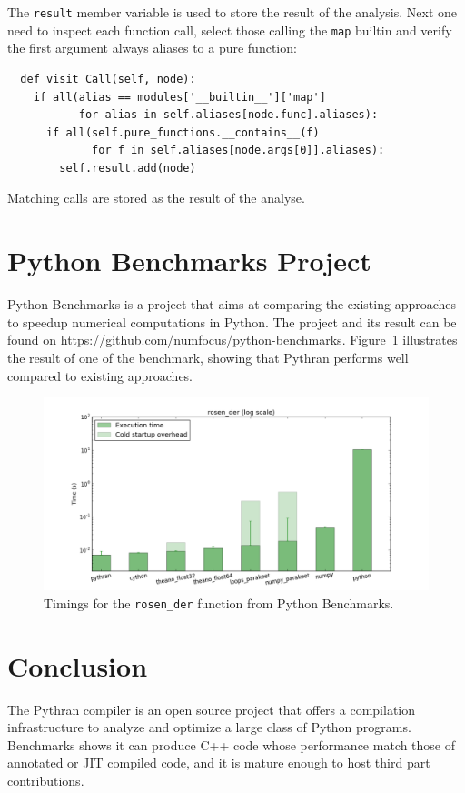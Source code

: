 \documentclass{llncs}
\begin{document}
The \texttt{result} member variable is used to store the result of the
analysis. Next one need to inspect each function call, select those calling the
\texttt{map} builtin and verify the first argument always aliases to a pure
function:

\begin{lstlisting}
  def visit_Call(self, node):
    if all(alias == modules['__builtin__']['map']
           for alias in self.aliases[node.func].aliases):
      if all(self.pure_functions.__contains__(f)
             for f in self.aliases[node.args[0]].aliases):
        self.result.add(node)
\end{lstlisting}

Matching calls are stored as the result of the analyse.

\section{Python Benchmarks Project}
\label{sec:python-benchmarks}

Python Benchmarks is a project that aims at comparing the existing approaches to
speedup numerical computations in Python. The project and its result can be
found on \url{https://github.com/numfocus/python-benchmarks}.
Figure~\ref{fig:python-benchmarks} illustrates the result of one of the
benchmark, showing that Pythran performs well compared to existing approaches.

\begin{figure}

    \includegraphics[width=\textwidth]{rosen_der_logscale}
    \caption{Timings for the \texttt{rosen\_der} function from Python Benchmarks.}
    \label{fig:python-benchmarks}

\end{figure}

\section{Conclusion}

The Pythran compiler is an open source project that offers a compilation
infrastructure to analyze and optimize a large class of Python programs.
Benchmarks shows it can produce C++ code whose performance match those of
annotated or JIT compiled code, and it is mature enough to host third part
contributions.
\end{document}
